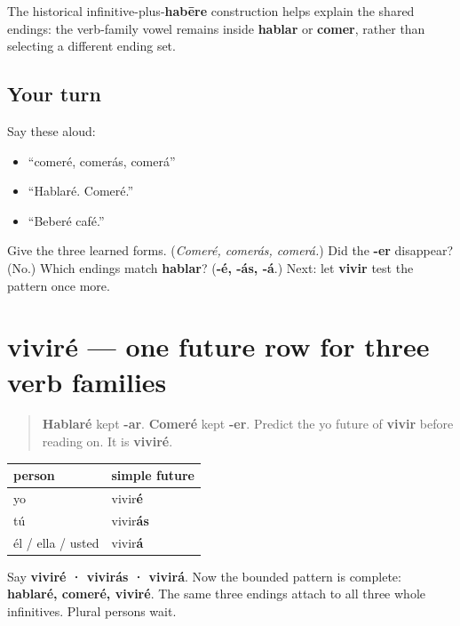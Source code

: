 \begin{cousinweb}
The historical infinitive-plus-\textbf{habēre} construction helps explain the shared endings: the verb-family vowel remains inside \textbf{hablar} or \textbf{comer}, rather than selecting a different ending set.
\end{cousinweb}

\subsection*{Your turn}
Say these aloud:

\begin{itemize}
\raggedright
  \item “comeré, comerás, comerá”
  \item “Hablaré. Comeré.”
  \item “Beberé café.”
\end{itemize}

\begin{tcolorbox}[breakable,colback=teal!4,colframe=teal!35!black,title={Before you move on}]
Give the three learned forms. (\emph{Comeré, comerás, comerá.}) Did the \textbf{-er} disappear? (No.) Which endings match \textbf{hablar}? (\textbf{-é, -ás, -á}.) Next: let \textbf{vivir} test the pattern once more.
\end{tcolorbox}
\section[viviré]{viviré — one future row for three verb families}

\label{lesson:ES-C17-vivir-futuro}



\begin{quote}
\textbf{Hablaré} kept \textbf{-ar}. \textbf{Comeré} kept \textbf{-er}. Predict the yo future of \textbf{vivir} before reading on. It is \textbf{viviré}.
\end{quote}

\begin{grammarlens}[title={Grammar Lens: the singular -ir row}]
\noindent
\begin{tabularx}{\linewidth}{@{}>{\raggedright\arraybackslash}X>{\raggedright\arraybackslash}X@{}}
\toprule
\textbf{person} & \textbf{simple future} \\
\midrule
yo & vivir\textbf{é} \\
tú & vivir\textbf{ás} \\
él / ella / usted & vivir\textbf{á} \\
\bottomrule
\end{tabularx}

Say \textbf{viviré · vivirás · vivirá}. Now the bounded pattern is complete: \textbf{hablaré, comeré, viviré}. The same three endings attach to all three whole infinitives. Plural persons wait.
\end{grammarlens}

